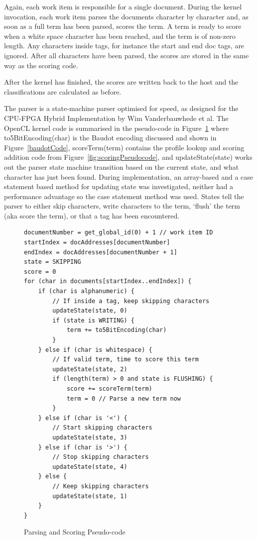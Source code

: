 Again, each work item is responsible for a single document. During the kernel
invocation, each work item parses the documents character by character and, as
soon as a full term has been parsed, scores the term. A term is ready to score
when a white space character has been reached, and the term is of non-zero
length. Any characters inside tags, for instance the start and end doc tags, are
ignored. After all characters have been parsed, the scores are stored in the
same way as the scoring code.

After the kernel has finished, the scores are written back to the host and the
classifications are calculated as before.

The parser is a state-machine parser optimised for speed, as designed for the
CPU-FPGA Hybrid Implementation \cite{HybridCPUFPGA} by Wim Vanderbauwhede et al.
The OpenCL kernel code is summarised in the pseudo-code in
Figure~\ref{fig:parsingScoringPseudocode} where to5BitEncoding(char) is the
Baudot encoding discussed and shown in Figure~\ref{baudotCode}, scoreTerm(term)
contains the profile lookup and scoring addition code from
Figure~\ref{fig:scoringPseudocode}, and updateState(state) works out the parser
state machine transition based on the current state, and what character has just
been found. During implementation, an array-based and a case statement based
method for updating state was investigated, neither had a performance advantage
so the case statement method was used. States tell the parser to either skip
characters, write characters to the term, `flush' the term (aka score the term),
or that a tag has been encountered.

\begin{figure}
\small\begin{verbatim}
documentNumber = get_global_id(0) + 1 // work item ID
startIndex = docAddresses[documentNumber]
endIndex = docAddresses[documentNumber + 1]
state = SKIPPING
score = 0
for (char in documents[startIndex..endIndex]) {
    if (char is alphanumeric) {
        // If inside a tag, keep skipping characters
        updateState(state, 0)
        if (state is WRITING) {
            term += to5BitEncoding(char)
        }
    } else if (char is whitespace) {
        // If valid term, time to score this term
        updateState(state, 2)
        if (length(term) > 0 and state is FLUSHING) {
            score += scoreTerm(term)
            term = 0 // Parse a new term now
        }
    } else if (char is '<') {
        // Start skipping characters
        updateState(state, 3)
    } else if (char is '>') {
        // Stop skipping characters
        updateState(state, 4)
    } else {
        // Keep skipping characters
        updateState(state, 1)
    }
}
\end{verbatim}
\caption{Parsing and Scoring Pseudo-code}
\label{fig:parsingScoringPseudocode}
\end{figure}

